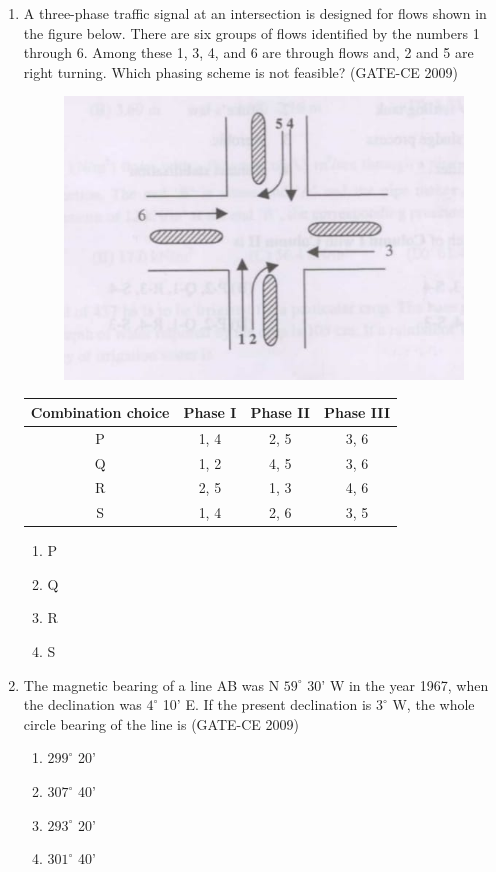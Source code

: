 \documentclass[journal,12pt,onecolumn]{article}
\theoremstyle{remark}
\begin{document}
\begin{enumerate}
    \item A three-phase traffic signal at an intersection is designed for flows shown in the figure below. There are six groups of flows identified by the numbers 1 through 6. Among these 1, 3, 4, and 6 are through flows and, 2 and 5 are right turning. Which phasing scheme is not feasible? (GATE-CE 2009)
    \begin{figure}[H]
    \centering
    \includegraphics[width=0.7\columnwidth]{figs/image4.jpg}
    \label{fig:placeholder}
    \end{figure}
    \begin{tabular}{|c|c|c|c|}
    \hline
    Combination choice & Phase I & Phase II & Phase III \\
    \hline
    P & 1, 4 & 2, 5 & 3, 6 \\
    Q & 1, 2 & 4, 5 & 3, 6 \\
    R & 2, 5 & 1, 3 & 4, 6 \\
    S & 1, 4 & 2, 6 & 3, 5 \\
    \hline
    \end{tabular}
    \begin{enumerate}
        \item P 
        \item Q 
        \item R 
        \item S
    \end{enumerate}
    
    \item The magnetic bearing of a line AB was N $59^\circ$ 30' W in the year 1967, when the declination was $4^\circ$ 10' E. If the present declination is $3^\circ$ W, the whole circle bearing of the line is (GATE-CE 2009)
    \begin{enumerate}
        \item $299^\circ$ 20' 
        \item $307^\circ$ 40' 
        \item $293^\circ$ 20' 
        \item $301^\circ$ 40'
    \end{enumerate}
    

\end{enumerate}
\end{document}

